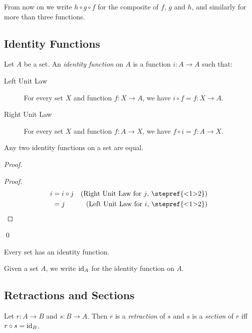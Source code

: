 From now on we write $h \circ g \circ f$ for the composite of $f$, $g$ and
$h$, and similarly for more than three functions.

\subsection{Identity Functions}

\begin{df}
  Let $A$ be a set. An \emph{identity function} on $A$ is a function $i : A \rightarrow A$ such that:
  \begin{description}
  \item[Left Unit Law]
  For every set $X$ and function $f : X \rightarrow A$, we have $i \circ f = f : X \rightarrow A$.
  \item[Right Unit Law]
  For every set $X$ and function $f : A \rightarrow X$, we have $f \circ i = f : A \rightarrow X$.
  \end{description}
\end{df}

\begin{prop}
  Any two identity functions on a set are equal.
\end{prop}

\begin{proof}
  \pf
  \begin{proof}
    \pf
    \begin{align*}
      i & = i \circ j & (\text{Right Unit Law for $j$, \stepref{<1>2}}) \\
      & = j & (\text{Left Unit Law for $i$, \stepref{<1>2}})
    \end{align*}
  \end{proof}
  \qed
\end{proof}

\begin{ax}
  Every set has an identity function.
\end{ax}

Given a set $A$, we write $\mathrm{id}_{A}$ for the identity function on $A$.

\subsection{Retractions and Sections}

\begin{df}
Let $r : A \rightarrow B$ and $s : B \rightarrow A$. Then $r$ is a \emph{retraction} of $s$ and $s$ is a \emph{section} of $r$ iff $r \circ s = \mathrm{id}_{B}$.
\end{df}

